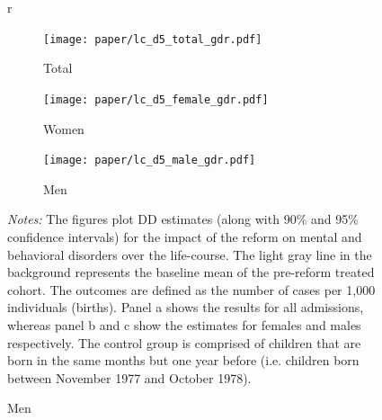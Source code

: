 \documentclass[11pt, a4paper]{article} %
\begin{document}
\begin{landscape}
	\vspace*{\fill}
	\begin{figure}[H]\centering
		\caption{Life-course approach for \textbf{mental and behavioral disorders}}\label{fig: lc_d5_frg_DD}r	\begin{subfigure}[h]{0.31\linewidth}\centering\caption{Total}
			\texttt{[image: paper/lc\_d5\_total\_gdr.pdf]}
		\end{subfigure}
		\begin{subfigure}[h]{0.31\linewidth}\centering\caption{Women}
			\texttt{[image: paper/lc\_d5\_female\_gdr.pdf]}
		\end{subfigure}
		\quad
		\begin{subfigure}[h]{0.31\linewidth}\centering\caption{Men}
			\texttt{[image: paper/lc\_d5\_male\_gdr.pdf]}
		\end{subfigure}
		\scriptsize
		\begin{minipage}{\linewidth}
			\emph{Notes:} The figures plot DD estimates (along with 90\% and 95\% confidence intervals) for the impact of the reform on mental and behavioral disorders over the life-course. The light gray line in the background represents the baseline mean of the pre-reform treated cohort. The outcomes are defined as the number of cases per 1,000 individuals (births). Panel a shows the results for all admissions, whereas panel b and c show the estimates for females and males respectively. The control group is comprised of children	that are born in the same months but one year before (i.e. children born between November 1977 and October 1978).
		\end{minipage}
	\end{figure}
	\vspace*{\fill}\clearpage
\end{landscape}

%
\end{document}
